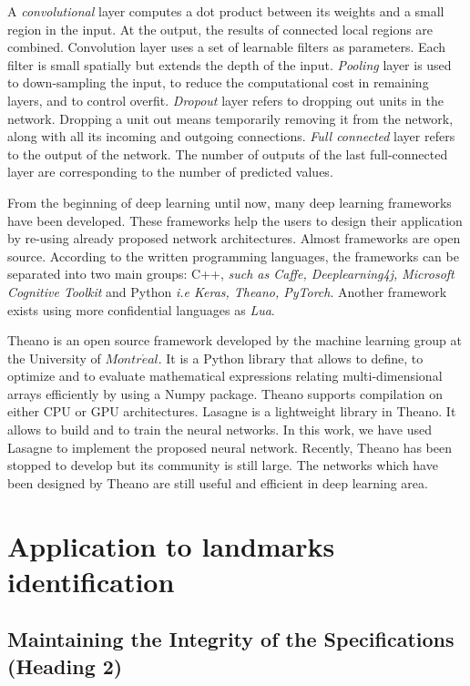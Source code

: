 \documentclass{article} %
\begin{document}
\begin{multicols}{2}
A \textit{convolutional} layer computes a dot product between its weights and a small region in the input. At the output, the results of connected local regions are combined. Convolution layer uses a set of learnable filters as parameters. Each filter is small spatially but extends the depth of the input. \textit{Pooling} layer is used to down-sampling the input, to reduce the computational cost in remaining layers, and to control overfit. \textit{Dropout} layer refers to dropping out units in the network. Dropping a unit out means temporarily removing it from the network, along with all its incoming and outgoing connections. \textit{Full connected} layer refers to the output of the network. The number of outputs of the last full-connected layer are corresponding to the number of predicted values.

From the beginning of deep learning until now, many deep learning frameworks have been developed.
These frameworks help the users to design their application by re-using already proposed network architectures. Almost frameworks are open source. According to the written programming languages, the frameworks can be separated into two main groups: C++, \textit{such as Caffe, Deeplearning4j, Microsoft Cognitive Toolkit} and Python \textit{i.e Keras, Theano, PyTorch}. Another framework exists using more confidential languages as \textit{Lua}.

Theano \cite{theanoframework} is an open source framework developed by the machine learning group at the University of $Montr\acute{e}al$. It is a Python library that allows to define, to optimize and to evaluate mathematical expressions relating multi-dimensional arrays efficiently by using a Numpy package. Theano supports compilation on either CPU or GPU architectures. Lasagne \cite{lasagne} is a lightweight library in Theano. It allows to build and to train the neural networks. In this work, we have used Lasagne to implement the proposed neural network. Recently, Theano has been stopped to develop but its community is still large. The networks which have been designed by Theano are still useful and efficient in deep learning area.
\section{Application to landmarks identification}


\subsection{Maintaining the Integrity of the Specifications (Heading 2)}




\end{multicols}
\end{document}

